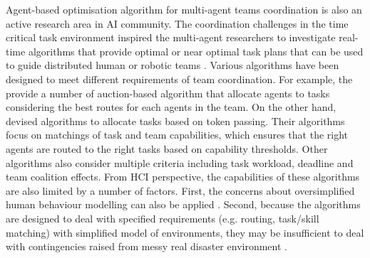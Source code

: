 
Agent-based optimisation algorithm for multi-agent teams coordination is also an active research area in \ac{AI} community. The coordination challenges in the time critical task environment inspired the multi-agent researchers to investigate real-time algorithms that provide optimal or near optimal task plans that can be used to guide distributed human or robotic teams \cite{Kitano2000}. Various algorithms have been designed to meet different requirements of team coordination. For example, the \cite{Lagoudakis2005} provide a number of auction-based algorithm that allocate agents to tasks considering the best routes for each agents in the team. On the other hand, \cite{Scerri2005a} devised algorithms to allocate tasks based on token passing. Their algorithms focus on matchings of task and team capabilities, which ensures that the right agents are routed to the right tasks based on capability thresholds. Other algorithms \cite{Ramchurn2010,Koes2005} also consider multiple criteria including task workload, deadline and team coalition effects. From \ac{HCI} perspective, the capabilities of these algorithms are also limited by a number of factors. First, the concerns about oversimplified human behaviour modelling can also be applied \cite{Drury2009}. Second, because the algorithms are designed to deal with specified requirements (e.g. routing, task/skill matching) with simplified model of environments, they may be insufficient to deal with contingencies raised from messy real disaster environment \cite{Armenakis2012}.\\

